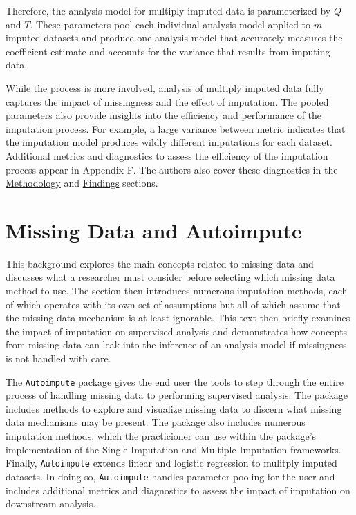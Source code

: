 \documentclass[12pt,oneside]{chicagocapstone}
\begin{document}
Therefore, the analysis model for multiply imputed data is parameterized
by \(\bar Q\) and \(T\). These parameters pool each individual analysis
model applied to \(m\) imputed datasets and produce one analysis model
that accurately measures the coefficient estimate and accounts for the
variance that results from imputing data.

While the process is more involved, analysis of multiply imputed data
fully captures the impact of missingness and the effect of imputation.
The pooled parameters also provide insights into the efficiency and
performance of the imputation process. For example, a large variance
between metric indicates that the imputation model produces wildly
different imputations for each dataset. Additional metrics and
diagnostics to assess the efficiency of the imputation process appear in
Appendix F. The authors also cover these diagnostics in the
\protect\hyperlink{methodology}{Methodology} and
\protect\hyperlink{findings}{Findings} sections.

\section*{Missing Data and
Autoimpute}\label{background-missing-data-autoimpute}

This background explores the main concepts related to missing data and
discusses what a researcher must consider before selecting which missing
data method to use. The section then introduces numerous imputation
methods, each of which operates with its own set of assumptions but all
of which assume that the missing data mechanism is at least ignorable.
This text then briefly examines the impact of imputation on supervised
analysis and demonstrates how concepts from missing data can leak into
the inference of an analysis model if missingness is not handled with
care.

The \texttt{Autoimpute} package gives the end user the tools to step
through the entire process of handling missing data to performing
supervised analysis. The package includes methods to explore and
visualize missing data to discern what missing data mechanisms may be
present. The package also includes numerous imputation methods, which
the practicioner can use within the package's implementation of the
Single Imputation and Multiple Imputation frameworks. Finally,
\texttt{Autoimpute} extends linear and logistic regression to mulitply
imputed datasets. In doing so, \texttt{Autoimpute} handles parameter
pooling for the user and includes additional metrics and diagnostics to
assess the impact of imputation on downstream analysis.
\end{document}
